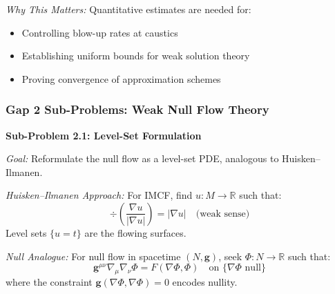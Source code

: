 \textit{Why This Matters:} Quantitative estimates are needed for:
\begin{itemize}
    \item Controlling blow-up rates at caustics
    \item Establishing uniform bounds for weak solution theory
    \item Proving convergence of approximation schemes
\end{itemize}

\subsubsection{Gap 2 Sub-Problems: Weak Null Flow Theory}

\begin{center}
\end{center}

\textbf{Sub-Problem 2.1: Level-Set Formulation}

\textit{Goal:} Reformulate the null flow as a level-set PDE, analogous to Huisken--Ilmanen.

\textit{Huisken--Ilmanen Approach:} For IMCF, find $u: M \to \mathbb{R}$ such that:
\begin{equation}
    \div\left(\frac{\nabla u}{|\nabla u|}\right) = |\nabla u| \quad \text{(weak sense)}
\end{equation}
Level sets $\{u = t\}$ are the flowing surfaces.

\textit{Null Analogue:} For null flow in spacetime $(N, \mathbf{g})$, seek $\Phi: N \to \mathbb{R}$ such that:
\begin{equation}
    \mathbf{g}^{\mu\nu}\nabla_\mu\nabla_\nu \Phi = F(\nabla\Phi, \Phi) \quad \text{on } \{\nabla\Phi \text{ null}\}
\end{equation}
where the constraint $\mathbf{g}(\nabla\Phi, \nabla\Phi) = 0$ encodes nullity.

